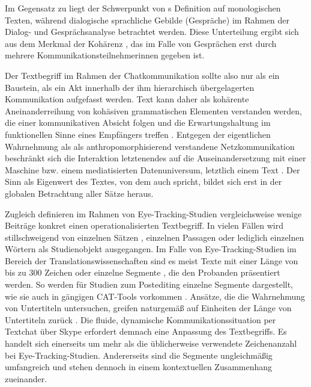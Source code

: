Im Gegensatz zu \citeauthor{beiswenger_sprachhandlungskoordination_2007} liegt der Schwerpunkt von \citeauthor{brinker_text-_2001}s Definition auf monologischen Texten, während \glqq dialogische sprachliche Gebilde (Gespräche)\grqq{} \citep[17]{brinker_text-_2001} im Rahmen der Dialog- und Gesprächsanalyse betrachtet werden. Diese Unterteilung ergibt sich aus dem \glqq Merkmal der Kohärenz\grqq{} \citep[12]{brinker_text-_2001}, das im Falle von Gesprächen erst durch mehrere Kommunikationsteilnehmer{\textperiodcentered}innen gegeben ist.

Der Textbegriff im Rahmen der Chatkommunikation sollte also nur als ein Baustein, als ein Akt innerhalb der ihm hierarchisch übergelagerten Kommunikation aufgefasst werden. Text kann daher als kohärente Aneinanderreihung von kohäsiven grammatischen Elementen verstanden werden, die einer kommunikativen Absicht folgen und die Erwartungshaltung im funktionellen Sinne eines Empfängers treffen \citep[1187]{busmann_routledge_1998}. Entgegen der eigentlichen Wahrnehmung als als \glqq anthropomorphisierend\grqq{} \citep[7]{beck_computervermittelte_2006} verstandene Netzkommunikation beschränkt sich die Interaktion letztenendes auf die Auseinandersetzung \glqq mit einer Maschine bzw. einem mediatisierten Datenuniversum, letztlich einem Text\grqq{} \citep[7]{beck_computervermittelte_2006}. Der Sinn als Eigenwert des Textes, von dem auch \citet[184\psqq]{coseriu_kontrastive_1988} spricht, bildet sich erst in der globalen Betrachtung aller Sätze heraus.

Zugleich definieren im Rahmen von Eye-Tracking-Studien vergleichsweise wenige Beiträge konkret einen operationalisierten Textbegriff. In vielen Fällen wird stillschweigend von einzelnen Sätzen \citep[]{rayner_eye_2003}, einzelnen Passagen oder lediglich einzelnen Wörtern als Studienobjekt ausgegangen. Im Falle von Eye-Tracking-Studien im Bereich der Translationswissenschaften sind es meist Texte mit einer Länge von bis zu 300 Zeichen \citep[]{lykke_jakobsen_eye_2008} oder einzelne Segmente \citep[]{jakobsen_reading_2017}, die den Probanden präsentiert werden. So werden für Studien zum Postediting einzelne Segmente dargestellt, wie sie auch in gängigen CAT-Tools vorkommen \citep[]{jakobsen_reading_2017, vardaro_translation_2019}. Ansätze, die die Wahrnehmung von Untertiteln untersuchen, greifen naturgemäß auf Einheiten der Länge von Untertiteln zurück \citep[]{bisson_processing_2014, fox_can_2018, kruger_multimodal_2018}. Die fluide, dynamische Kommunikationssituation per Textchat über Skype erfordert demnach eine Anpassung des Textbegriffs. Es handelt sich einerseits um mehr als die üblicherweise verwendete Zeichenanzahl bei Eye-Tracking-Studien. Andererseits sind die Segmente ungleichmäßig umfangreich und stehen dennoch in einem kontextuellen Zusammenhang zueinander.

